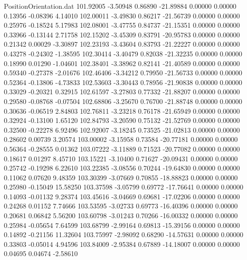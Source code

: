 \begin{filecontents}{PositionOrientation.dat}
 101.92005   -3.50948    0.86890   -21.89884    0.00000    0.00000    0.13956   -0.08396    4.14010
 102.00011   -3.49830    0.86217   -21.56739    0.00000    0.00000    0.25976   -0.18524    5.17983
 102.08001   -3.47755    0.84737   -21.15351    0.00000    0.00000    0.33966   -0.13144    2.71758
 102.15202   -3.45309    0.83791   -20.95783    0.00000    0.00000    0.21342    0.00029   -3.30897
 102.23193   -3.43604    0.83793   -21.22227    0.00000    0.00000    0.43278   -0.24302   -1.38595
 102.30414   -3.40479    0.82038   -21.32235    0.00000    0.00000    0.18990    0.01290   -1.04601
 102.38401   -3.38962    0.82141   -21.40589    0.00000    0.00000    0.59340   -0.27378   -2.01676
 102.46406   -3.34212    0.79950   -21.56733    0.00000    0.00000    0.52364   -0.13806   -4.73833
 102.53603   -3.30443    0.78956   -21.90838    0.00000    0.00000    0.33029   -0.20321    0.32915
 102.61597   -3.27803    0.77332   -21.88207    0.00000    0.00000    0.29580   -0.08768   -0.07504
 102.68806   -3.25670    0.76700   -21.88748    0.00000    0.00000    0.30636   -0.06519    2.84803
 102.76811   -3.23218    0.76178   -21.65949    0.00000    0.00000    0.32924   -0.13100    1.65120
 102.84793   -3.20590    0.75132   -21.52769    0.00000    0.00000    0.32500   -0.22278    6.92496
 102.92007   -3.18245    0.73525   -21.02813    0.00000    0.00000    0.28602    0.00739    3.20574
 103.00002   -3.15958    0.73584   -20.77181    0.00000    0.00000    0.56364   -0.28555    0.01362
 103.07222   -3.11889    0.71523   -20.77082    0.00000    0.00000    0.18617    0.01297    8.45710
 103.15221   -3.10400    0.71627   -20.09431    0.00000    0.00000    0.25742   -0.19298    6.22610
 103.22385   -3.08556    0.70244   -19.64830    0.00000    0.00000    0.11062    0.07620    9.48359
 103.30399   -3.07669    0.70855   -18.88823    0.00000    0.00000    0.25980   -0.15049   15.58250
 103.37598   -3.05799    0.69772   -17.76641    0.00000    0.00000    0.14093   -0.01132    9.28374
 103.45616   -3.04669    0.69681   -17.02206    0.00000    0.00000    0.24268    0.01152    7.74666
 103.53595   -3.02733    0.69773   -16.40396    0.00000    0.00000    0.20681    0.06842    5.56200
 103.60798   -3.01243    0.70266   -16.00332    0.00000    0.00000    0.25984   -0.05654    7.64599
 103.68799   -2.99164    0.69813   -15.39156    0.00000    0.00000    0.14892   -0.21156   11.32604
 103.75997   -2.98092    0.68290   -14.57631    0.00000    0.00000    0.33803   -0.05014    4.94596
 103.84009   -2.95384    0.67889   -14.18007    0.00000    0.00000    0.04695    0.04674   -2.58610

\end{filecontents}
